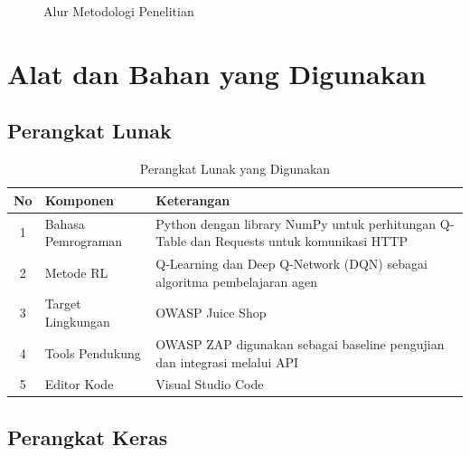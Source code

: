 \begin{figure}[H]
{
}
\caption{Alur Metodologi Penelitian}
\label{fig:alur_metodologi_penelitian}
\end{figure}

\section{Alat dan Bahan yang Digunakan}

\subsection{Perangkat Lunak}

\begin{table}[H]
\centering
\begin{tabular}{|c|l|p{8cm}|}
\hline
\textbf{No} & \textbf{Komponen} & \textbf{Keterangan} \\ \hline

1 & Bahasa Pemrograman & Python dengan library NumPy untuk perhitungan Q-Table dan Requests untuk komunikasi HTTP \\ \hline

2 & Metode RL & Q-Learning dan Deep Q-Network (DQN) sebagai algoritma pembelajaran agen \\ \hline

3 & Target Lingkungan & OWASP Juice Shop \\ \hline

4 & Tools Pendukung & OWASP ZAP digunakan sebagai baseline pengujian dan integrasi melalui API \\ \hline

5 & Editor Kode & Visual Studio Code \\ \hline

\end{tabular}
\caption{Perangkat Lunak yang Digunakan}
\end{table}

\subsection{Perangkat Keras}

